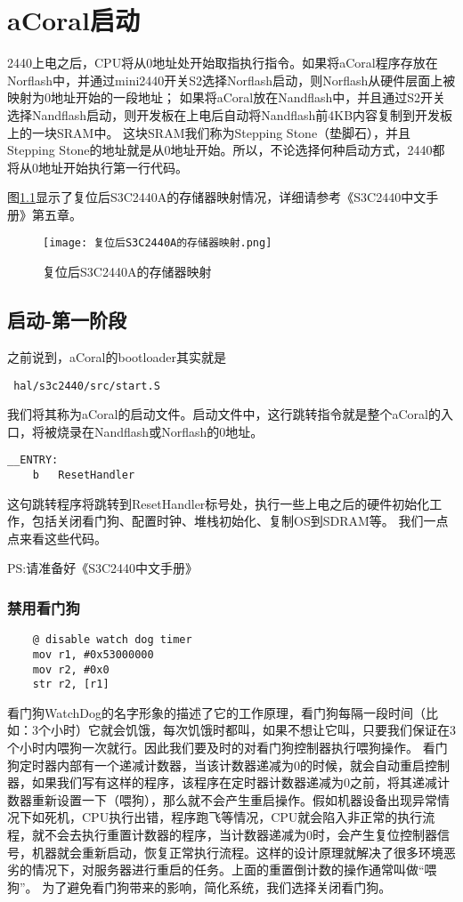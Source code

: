\chapter{aCoral启动}
2440上电之后，CPU将从0地址处开始取指执行指令。如果将aCoral程序存放在Norflash中，并通过mini2440开关S2选择Norflash启动，则Norflash从硬件层面上被映射为0地址开始的一段地址；
如果将aCoral放在Nandflash中，并且通过S2开关选择Nandflash启动，则开发板在上电后自动将Nandflash前4KB内容复制到开发板上的一块SRAM中。
这块SRAM我们称为Stepping Stone（垫脚石），并且Stepping Stone的地址就是从0地址开始。所以，不论选择何种启动方式，2440都将从0地址开始执行第一行代码。

图\ref{复位后S3C2440A的存储器映射}显示了复位后S3C2440A的存储器映射情况，详细请参考《S3C2440中文手册》第五章。
\begin{figure}[H]
	\texttt{[image: 复位后S3C2440A的存储器映射.png]}
	\caption{复位后S3C2440A的存储器映射}
	\label{复位后S3C2440A的存储器映射}
\end{figure}

\section{启动-第一阶段}
之前说到，aCoral的bootloader其实就是
\begin{lstlisting}
 hal/s3c2440/src/start.S 
\end{lstlisting}

我们将其称为aCoral的启动文件。启动文件中，这行跳转指令就是整个aCoral的入口，将被烧录在Nandflash或Norflash的0地址。
\begin{lstlisting}
__ENTRY:
	b	ResetHandler
\end{lstlisting}

这句跳转程序将跳转到ResetHandler标号处，执行一些上电之后的硬件初始化工作，包括关闭看门狗、配置时钟、堆栈初始化、复制OS到SDRAM等。
我们一点点来看这些代码。

PS:请准备好《S3C2440中文手册》

\subsection{禁用看门狗}
\begin{lstlisting}
	@ disable watch dog timer
	mov r1, #0x53000000
	mov	r2, #0x0
	str	r2, [r1]
\end{lstlisting}

看门狗WatchDog的名字形象的描述了它的工作原理，看门狗每隔一段时间（比如：3个小时）它就会饥饿，每次饥饿时都叫，如果不想让它叫，只要我们保证在3个小时内喂狗一次就行。因此我们要及时的对看门狗控制器执行喂狗操作。
看门狗定时器内部有一个递减计数器，当该计数器递减为0的时候，就会自动重启控制器，如果我们写有这样的程序，该程序在定时器计数器递减为0之前，将其递减计数器重新设置一下（喂狗），那么就不会产生重启操作。假如机器设备出现异常情况下如死机，CPU执行出错，程序跑飞等情况，CPU就会陷入非正常的执行流程，就不会去执行重置计数器的程序，当计数器递减为0时，会产生复位控制器信号，机器就会重新启动，恢复正常执行流程。这样的设计原理就解决了很多环境恶劣的情况下，对服务器进行重启的任务。上面的重置倒计数的操作通常叫做“喂狗”。
为了避免看门狗带来的影响，简化系统，我们选择关闭看门狗。

